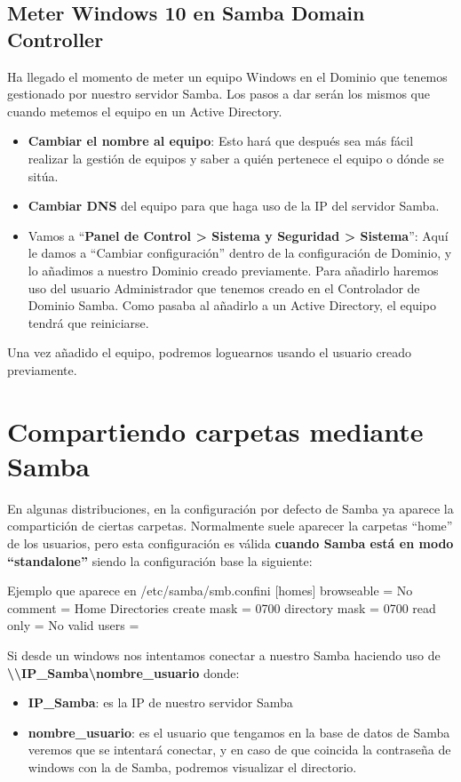 \subsection{Meter Windows 10 en Samba Domain Controller}
Ha llegado el momento de meter un equipo Windows en el Dominio que tenemos gestionado por nuestro servidor Samba. Los pasos a dar serán los mismos que cuando metemos el equipo en un Active Directory.
\begin{itemize}
    \item \textbf{Cambiar el nombre al equipo}: Esto hará que después sea más fácil realizar la gestión de equipos y saber a quién pertenece el equipo o dónde se sitúa.
    \item \textbf{Cambiar DNS} del equipo para que haga uso de la IP del servidor Samba.
    \item Vamos a “\textbf{Panel de Control > Sistema y Seguridad > Sistema}”: Aquí le damos a “Cambiar configuración” dentro de la configuración de Dominio, y lo añadimos a nuestro Dominio creado previamente. Para añadirlo haremos uso del usuario Administrador que tenemos creado en el Controlador de Dominio Samba. Como pasaba al añadirlo a un Active Directory, el equipo tendrá que reiniciarse.
\end{itemize}
Una vez añadido el equipo, podremos loguearnos usando el usuario creado previamente.

\section{Compartiendo carpetas mediante Samba}
En algunas distribuciones, en la configuración por defecto de Samba ya aparece la compartición de ciertas carpetas. Normalmente suele aparecer la carpetas “home” de los usuarios, pero esta configuración es válida \textbf{cuando Samba está en modo “standalone”} siendo la configuración base la siguiente:


\begin{mycode}{Ejemplo que aparece en \faFile /etc/samba/smb.conf}{ini}{}
[homes]
    browseable = No
    comment = Home Directories
    create mask = 0700
    directory mask = 0700
    read only = No
    valid users = %
\end{mycode}

Si desde un windows nos intentamos conectar a nuestro Samba haciendo uso de \textbf{\textbackslash \textbackslash IP\_Samba\textbackslash nombre\_usuario}  donde:

\begin{itemize}
    \item \textbf{IP\_Samba}: es la IP de nuestro servidor Samba
    \item \textbf{nombre\_usuario}: es el usuario que tengamos en la base de datos de Samba veremos que se intentará conectar, y en caso de que coincida la contraseña de windows con la de Samba, podremos visualizar el directorio.
\end{itemize}

